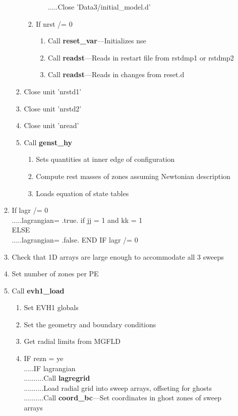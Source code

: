 \documentclass[11pt,doublespace]{article}
\begin{document}
\begin{itemize}
\begin{enumerate}
\begin{enumerate}
\begin{enumerate}
\begin{enumerate}
.....Close 'Data3/initial\_model.d'
\end{enumerate}
  \item If nrst /= 0
\begin{enumerate}
  \item Call {\bf reset\_var}---Initializes nse
  \item Call {\bf readst}---Reads in restart file from rstdmp1 or rstdmp2
  \item Call {\bf readst}---Reads in changes from reset.d
\end{enumerate}
\end{enumerate}
  \item Close unit 'nrstd1'
  \item Close unit 'nrstd2'
  \item Close unit 'nread'
  \item Call {\bf genst\_hy}
\begin{enumerate}
  \item Sets quantities at inner edge of configuration
  \item Compute rest masses of zones assuming Newtonian description
  \item Loads equation of state tables
\end{enumerate}
\end{enumerate}
  \item If lagr /= 0\\
.....lagrangian= .true. if jj = 1 and kk = 1\\
ELSE\\
.....lagrangian= .false.
END IF lagr /= 0
  \item Check that 1D arrays are large enough to accommodate all 3 sweeps
  \item Set number of zones per PE
  \item Call {\bf evh1\_load}
\begin{enumerate}
  \item Set EVH1 globals
  \item Set the geometry and boundary conditions
  \item Get radial limits from MGFLD
  \item IF rezn = ye\\
 .....IF lagrangian\\
 ..........Call {\bf lagregrid}\\
 ..........Load radial grid into sweep arrays, offseting for ghosts\\
 ..........Call {\bf coord\_bc}---Set coordinates in ghost zones of sweep arrays\\

\end{enumerate}
\end{enumerate}
\end{itemize}
\end{document}
